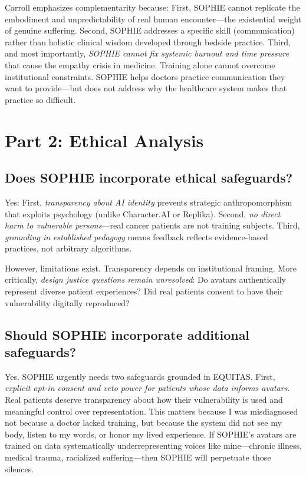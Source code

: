 \documentclass[12pt,twoside]{article}
\begin{document}
Carroll emphasizes complementarity because: First, SOPHIE cannot replicate the embodiment and unpredictability of real human encounter—the existential weight of genuine suffering. Second, SOPHIE addresses a specific skill (communication) rather than holistic clinical wisdom developed through bedside practice. Third, and most importantly, \emph{SOPHIE cannot fix systemic burnout and time pressure} that cause the empathy crisis in medicine. Training alone cannot overcome institutional constraints. SOPHIE helps doctors practice communication they want to provide—but does not address why the healthcare system makes that practice so difficult.

\section*{Part 2: Ethical Analysis}

\subsection*{Does SOPHIE incorporate ethical safeguards?}

Yes: First, \emph{transparency about AI identity} prevents strategic anthropomorphism that exploits psychology (unlike Character.AI or Replika). Second, \emph{no direct harm to vulnerable persons}—real cancer patients are not training subjects. Third, \emph{grounding in established pedagogy} means feedback reflects evidence-based practices, not arbitrary algorithms.

However, limitations exist. Transparency depends on institutional framing. More critically, \emph{design justice questions remain unresolved}: Do avatars authentically represent diverse patient experiences? Did real patients consent to have their vulnerability digitally reproduced?

\subsection*{Should SOPHIE incorporate additional safeguards?}

Yes. SOPHIE urgently needs two safeguards grounded in EQUITAS. First, \emph{explicit opt-in consent and veto power for patients whose data informs avatars}. Real patients deserve transparency about how their vulnerability is used and meaningful control over representation. This matters because I was misdiagnosed not because a doctor lacked training, but because the system did not see my body, listen to my words, or honor my lived experience. If SOPHIE's avatars are trained on data systematically underrepresenting voices like mine—chronic illness, medical trauma, racialized suffering—then SOPHIE will perpetuate those silences.
\end{document}
